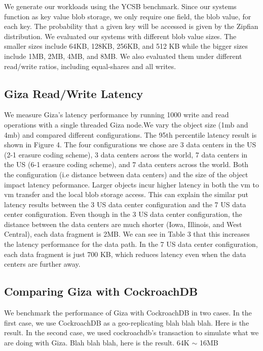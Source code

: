 We generate our workloads using the YCSB benchmark. Since our systems function as key value blob storage, we only require one field, the blob value, for each key. The probability that a given key will be accessed is given by the Zipfian distribution. We evaluated our systems with different blob value sizes. The smaller sizes include 64KB, 128KB, 256KB, and 512 KB while the bigger sizes include 1MB, 2MB, 4MB, and 8MB. We also evaluated them under different read/write ratios, including equal-shares and all writes.

\subsection{Giza Read/Write Latency}
We measure Giza's latency performance by running 1000 write and read operations with a single threaded Giza node.We vary the object size (1mb and 4mb) and compared different configurations. 
The 95th percentile latency result is shown in Figure 4. The four configurations we chose are 3 data centers in the US (2-1 erasure coding scheme), 3 data centers across the world, 7 data centers in the US (6-1 erasure coding scheme), and 7 data centers across the world. Both the configuration (i.e distance between data centers) and the size of the object impact latency peformance. Larger objects incur higher latency in both the vm to vm transfer and the local blob storage access. This can explain the similar put latency results between the 3 US data center configuration and the 7 US data center configuration. Even though in the 3 US data center configuration, the distance between the data centers are much shorter (Iowa, Illinois, and West Central), each data fragment is 2MB. We can see in Table 3 that this increases the latency performance for the data path. In the 7 US data center configuration, each data fragment is just 700 KB, which reduces latency even when the data centers are further away. 


\subsection{Comparing Giza with CockroachDB}
We benchmark the performance of Giza with CockroachDB in two cases. In the first case, we use CockroachDB as a geo-replicating blah blah blah. Here is the result.
In the second case, we used cockroachdb's transaction to simulate what we are doing with Giza. Blah blah blah, here is the result.
64K $\sim$ 16MB

